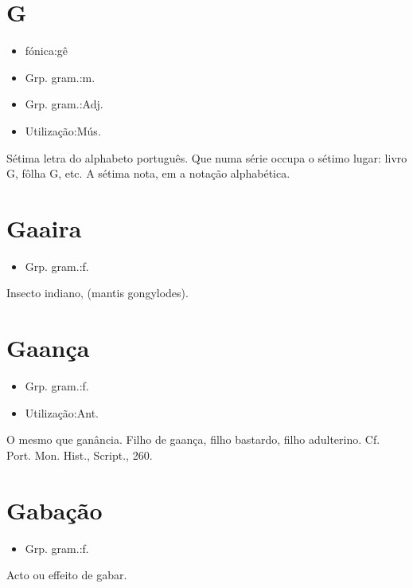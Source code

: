 \section{G}
\begin{itemize}
\item {fónica:gê}
\end{itemize}
\begin{itemize}
\item {Grp. gram.:m.}
\end{itemize}
\begin{itemize}
\item {Grp. gram.:Adj.}
\end{itemize}
\begin{itemize}
\item {Utilização:Mús.}
\end{itemize}
Sétima letra do alphabeto português.
Que numa série occupa o sétimo lugar: \textunderscore livro G\textunderscore , \textunderscore fôlha G\textunderscore , etc.
A sétima nota, em a notação alphabética.
\section{Gaaira}
\begin{itemize}
\item {Grp. gram.:f.}
\end{itemize}
Insecto indiano, (\textunderscore mantis gongylodes\textunderscore ).
\section{Gaança}
\begin{itemize}
\item {Grp. gram.:f.}
\end{itemize}
\begin{itemize}
\item {Utilização:Ant.}
\end{itemize}
O mesmo que \textunderscore ganância\textunderscore .
\textunderscore Filho de gaança\textunderscore , filho bastardo, filho adulterino. Cf. \textunderscore Port. Mon. Hist.\textunderscore , \textunderscore Script.\textunderscore , 260.
\section{Gabação}
\begin{itemize}
\item {Grp. gram.:f.}
\end{itemize}
Acto ou effeito de gabar.
